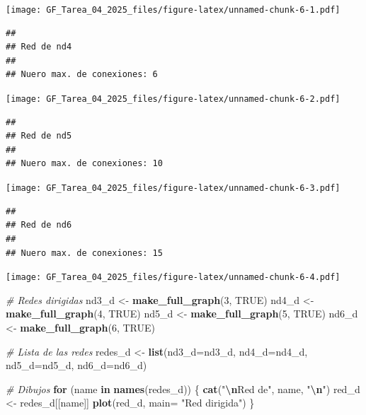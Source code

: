 \documentclass[
]{article}
\newenvironment{Shaded}{\begin{snugshade}}{\end{snugshade}}
\newcommand{\AttributeTok}[1]{\textcolor[rgb]{0.13,0.29,0.53}{#1}}
\newcommand{\CommentTok}[1]{\textcolor[rgb]{0.56,0.35,0.01}{\textit{#1}}}
\newcommand{\ConstantTok}[1]{\textcolor[rgb]{0.56,0.35,0.01}{#1}}
\newcommand{\ControlFlowTok}[1]{\textcolor[rgb]{0.13,0.29,0.53}{\textbf{#1}}}
\newcommand{\DecValTok}[1]{\textcolor[rgb]{0.00,0.00,0.81}{#1}}
\newcommand{\FunctionTok}[1]{\textcolor[rgb]{0.13,0.29,0.53}{\textbf{#1}}}
\newcommand{\NormalTok}[1]{#1}
\newcommand{\OtherTok}[1]{\textcolor[rgb]{0.56,0.35,0.01}{#1}}
\newcommand{\SpecialCharTok}[1]{\textcolor[rgb]{0.81,0.36,0.00}{\textbf{#1}}}
\newcommand{\StringTok}[1]{\textcolor[rgb]{0.31,0.60,0.02}{#1}}
\begin{document}
\texttt{[image: GF\_Tarea\_04\_2025\_files/figure-latex/unnamed-chunk-6-1.pdf]}

\begin{verbatim}
## 
## Red de nd4 
## 
## Nuero max. de conexiones: 6
\end{verbatim}

\texttt{[image: GF\_Tarea\_04\_2025\_files/figure-latex/unnamed-chunk-6-2.pdf]}

\begin{verbatim}
## 
## Red de nd5 
## 
## Nuero max. de conexiones: 10
\end{verbatim}

\texttt{[image: GF\_Tarea\_04\_2025\_files/figure-latex/unnamed-chunk-6-3.pdf]}

\begin{verbatim}
## 
## Red de nd6 
## 
## Nuero max. de conexiones: 15
\end{verbatim}

\texttt{[image: GF\_Tarea\_04\_2025\_files/figure-latex/unnamed-chunk-6-4.pdf]}

\begin{Shaded}
\begin{Highlighting}[]
\CommentTok{\# Redes dirigidas}
\NormalTok{nd3\_d }\OtherTok{\textless{}{-}} \FunctionTok{make\_full\_graph}\NormalTok{(}\DecValTok{3}\NormalTok{, }\ConstantTok{TRUE}\NormalTok{)}
\NormalTok{nd4\_d }\OtherTok{\textless{}{-}} \FunctionTok{make\_full\_graph}\NormalTok{(}\DecValTok{4}\NormalTok{, }\ConstantTok{TRUE}\NormalTok{)}
\NormalTok{nd5\_d }\OtherTok{\textless{}{-}} \FunctionTok{make\_full\_graph}\NormalTok{(}\DecValTok{5}\NormalTok{, }\ConstantTok{TRUE}\NormalTok{)}
\NormalTok{nd6\_d }\OtherTok{\textless{}{-}} \FunctionTok{make\_full\_graph}\NormalTok{(}\DecValTok{6}\NormalTok{, }\ConstantTok{TRUE}\NormalTok{)}

\CommentTok{\# Lista de las redes}
\NormalTok{redes\_d }\OtherTok{\textless{}{-}} \FunctionTok{list}\NormalTok{(}\AttributeTok{nd3\_d=}\NormalTok{nd3\_d, }\AttributeTok{nd4\_d=}\NormalTok{nd4\_d, }\AttributeTok{nd5\_d=}\NormalTok{nd5\_d, }\AttributeTok{nd6\_d=}\NormalTok{nd6\_d)}

\CommentTok{\# Dibujos}
\ControlFlowTok{for}\NormalTok{ (name }\ControlFlowTok{in} \FunctionTok{names}\NormalTok{(redes\_d)) \{}
  \FunctionTok{cat}\NormalTok{(}\StringTok{"}\SpecialCharTok{\textbackslash{}n}\StringTok{Red de"}\NormalTok{, name, }\StringTok{"}\SpecialCharTok{\textbackslash{}n}\StringTok{"}\NormalTok{)}
\NormalTok{  red\_d }\OtherTok{\textless{}{-}}\NormalTok{ redes\_d[[name]]}
  \FunctionTok{plot}\NormalTok{(red\_d, }\AttributeTok{main=} \StringTok{"Red dirigida"}\NormalTok{)}
\NormalTok{\}}
\end{Highlighting}
\end{Shaded}
\end{document}
